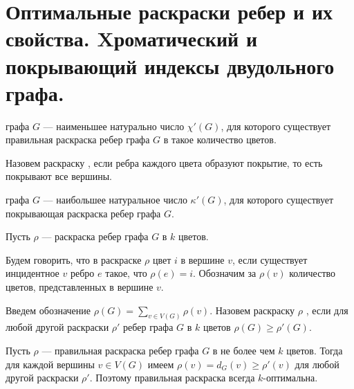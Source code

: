\section{Оптимальные раскраски ребер и их свойства. Xроматический и покрывающий индексы двудольного графа.}

\begin{definition}
      графа $G$ --- наименьшее натурально число $\chi'(G)$, для которого существует правильная раскраска ребер графа $G$ в такое количество цветов.

	 Назовем раскраску , если ребра каждого цвета образуют покрытие, то есть покрывают все вершины.

	  графа $G$ --- наибольшее натуральное число $\kappa'(G)$, для которого существует покрывающая раскраска ребер графа $G$. 
\end{definition}

\begin{definition}
    Пусть $\rho$ --- раскраска ребер графа $G$ в $k$ цветов. 

	Будем говорить, что в раскраске $\rho$ цвет $i$  в вершине $v$, если существует инцидентное $v$ ребро $e$ такое, что $\rho(e) = i$. Обозначим за $\rho(v)$ количество цветов, представленных в вершине $v$.

	Введем обозначение $\rho(G) = \sum_{v \in V(G)}^{} \rho(v)$. Назовем раскраску $\rho$ , если для любой другой раскраски $\rho'$ ребер графа $G$ в $k$ цветов $\rho(G) \ge \rho'(G)$.
\end{definition}
Пусть $\rho$ --- правильная раскраска ребер графа $G$ в не более чем  $k$ цветов. Тогда для каждой вершины $v \in V(G)$ имеем $\rho(v) = d_{G}(v) \ge \rho'(v)$  для любой  другой раскраски $\rho'$. Поэтому правильная раскраска всегда $k$-оптимальна.

